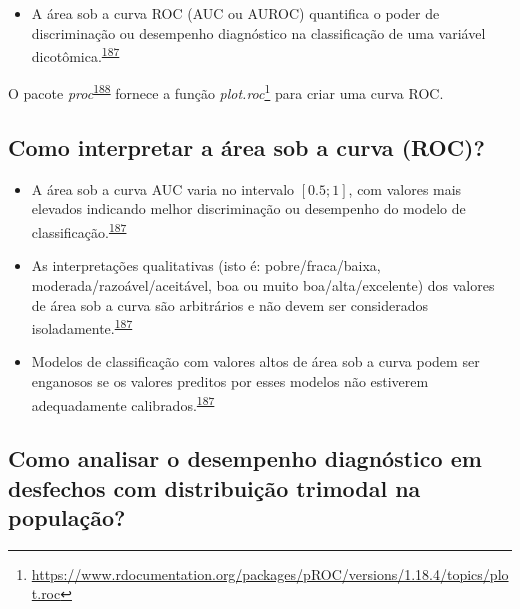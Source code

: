 \documentclass[
  a4paper,
]{book}
\providecommand{\tightlist}{%
  \setlength{\itemsep}{0pt}\setlength{\parskip}{0pt}}
\renewcommand{\href}[2]{#2\footnote{\url{#1}}}
\newenvironment{infobox}[1]
  {
  \begin{itemize}
  \renewcommand{\labelitemi}{
    \raisebox{-.7\height}[0pt][0pt]{
      {\setkeys{Gin}{width=3em,keepaspectratio}
        \texttt{[image: \#1]}}
    }
  }
  \setlength{\fboxsep}{1em}
  \begin{blackbox}
  \item
  }
  {
  \end{blackbox}
  \end{itemize}
  }
\begin{document}
\begin{itemize}
\tightlist
\item
  A área sob a curva ROC (AUC ou AUROC) quantifica o poder de discriminação ou desempenho diagnóstico na classificação de uma variável dicotômica.\textsuperscript{\protect\hyperlink{ref-de2022}{187}}
\end{itemize}

\begin{infobox}{images/Rlogo}
O pacote \emph{proc}\textsuperscript{\protect\hyperlink{ref-pROC}{188}} fornece a função \href{https://www.rdocumentation.org/packages/pROC/versions/1.18.4/topics/plot.roc}{\emph{plot.roc}} para criar uma curva ROC.

\end{infobox}

\hypertarget{como-interpretar-a-uxe1rea-sob-a-curva-roc}{%
\subsection{Como interpretar a área sob a curva (ROC)?}\label{como-interpretar-a-uxe1rea-sob-a-curva-roc}}

\begin{itemize}
\item
  A área sob a curva AUC varia no intervalo \([0.5; 1]\), com valores mais elevados indicando melhor discriminação ou desempenho do modelo de classificação.\textsuperscript{\protect\hyperlink{ref-de2022}{187}}
\item
  As interpretações qualitativas (isto é: pobre/fraca/baixa, moderada/razoável/aceitável, boa ou muito boa/alta/excelente) dos valores de área sob a curva são arbitrários e não devem ser considerados isoladamente.\textsuperscript{\protect\hyperlink{ref-de2022}{187}}
\item
  Modelos de classificação com valores altos de área sob a curva podem ser enganosos se os valores preditos por esses modelos não estiverem adequadamente calibrados.\textsuperscript{\protect\hyperlink{ref-de2022}{187}}
\end{itemize}

\hypertarget{como-analisar-o-desempenho-diagnuxf3stico-em-desfechos-com-distribuiuxe7uxe3o-trimodal-na-populauxe7uxe3o}{%
\subsection{Como analisar o desempenho diagnóstico em desfechos com distribuição trimodal na população?}\label{como-analisar-o-desempenho-diagnuxf3stico-em-desfechos-com-distribuiuxe7uxe3o-trimodal-na-populauxe7uxe3o}}
\end{document}
